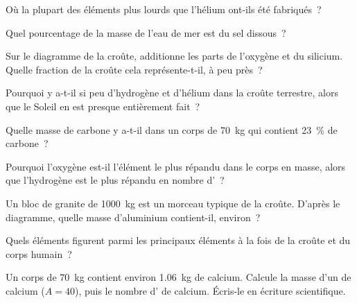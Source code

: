 \begin{exercise}[$\star$]\label{exo:g9:elements-universe-earth:3}
Où la plupart des éléments plus lourds que l'hélium ont-ils été
fabriqués~?
\end{exercise}

\begin{exercise}[$\star$]\label{exo:g9:elements-universe-earth:4}
Quel pourcentage de la masse de l'eau de mer est du sel dissous~?
\end{exercise}

\begin{exercise}[$\star\star$]\label{exo:g9:elements-universe-earth:5}
Sur le diagramme de la croûte, additionne les parts de l'oxygène et du
silicium. Quelle fraction de la croûte cela représente-t-il, à peu
près~?
\end{exercise}

\begin{exercise}[$\star\star$]\label{exo:g9:elements-universe-earth:6}
Pourquoi y a-t-il si peu d'hydrogène et d'hélium dans la croûte
terrestre, alors que le Soleil en est presque entièrement fait~?
\end{exercise}

\begin{exercise}[$\star\star$]\label{exo:g9:elements-universe-earth:7}
Quelle masse de carbone y a-t-il dans un corps de \qty{70}{kg} qui
contient \qty{23}{\percent} de carbone~?
\end{exercise}

\begin{exercise}[$\star\star$]\label{exo:g9:elements-universe-earth:8}
Pourquoi l'oxygène est-il l'élément le plus répandu dans le corps en
masse, alors que l'hydrogène est le plus répandu en nombre d'~?
\end{exercise}

\begin{exercise}[$\star\star$]\label{exo:g9:elements-universe-earth:9}
Un bloc de granite de \qty{1000}{kg} est un morceau typique de la
croûte. D'après le diagramme, quelle masse d'aluminium contient-il,
environ~?
\end{exercise}

\begin{exercise}[$\star\star$]\label{exo:g9:elements-universe-earth:10}
Quels éléments figurent parmi les principaux éléments à la fois de la
croûte et du corps humain~?
\end{exercise}

\begin{exercise}[$\star\star\star$]\label{exo:g9:elements-universe-earth:11}
Un corps de \qty{70}{kg} contient environ \qty{1.06}{kg} de calcium.
Calcule la masse d'un  de calcium ($A = 40$), puis le nombre
d' de calcium. Écris-le en écriture scientifique.
\end{exercise}

